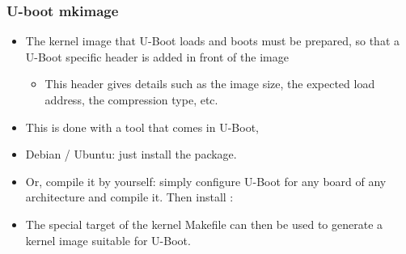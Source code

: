 \begin{frame}
  \frametitle{U-boot mkimage}
  \begin{itemize}
  \item The kernel image that U-Boot loads and boots must be prepared,
    so that a U-Boot specific header is added in front of the image
    \begin{itemize}
    \item This header gives details such as the image size, the
      expected load address, the compression type, etc.
    \end{itemize}
  \item This is done with a tool that comes in U-Boot, 
  \item Debian / Ubuntu: just install the  package.
  \item Or, compile it by yourself: simply configure U-Boot for any
    board of any architecture and compile it. Then install :\\
  \item The special target  of the kernel Makefile can
    then be used to generate a kernel image suitable for U-Boot.
\end{itemize}
\end{frame}
